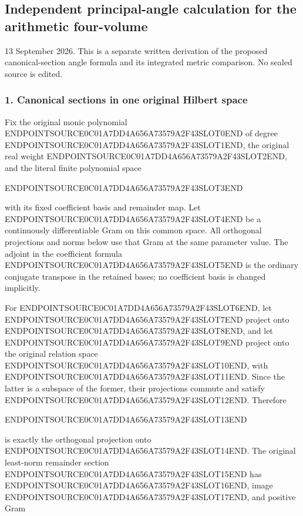 \subsection{Independent principal-angle calculation for the arithmetic four-volume}\label{endpoint-principal_angle_volume_review--independent-principal-angle-calculation-for-the-arithmetic-four-volume}

13 September 2026. This is a separate written derivation of the proposed canonical-section angle formula and its integrated metric comparison. No sealed source is edited.

\subsubsection{1. Canonical sections in one original Hilbert space}\label{endpoint-principal_angle_volume_review--canonical-sections-in-one-original-hilbert-space}

Fix the original monic polynomial ENDPOINTSOURCE0C01A7DD4A656A73579A2F43SLOT0END of degree ENDPOINTSOURCE0C01A7DD4A656A73579A2F43SLOT1END, the original real weight ENDPOINTSOURCE0C01A7DD4A656A73579A2F43SLOT2END, and the literal finite polynomial space

ENDPOINTSOURCE0C01A7DD4A656A73579A2F43SLOT3END

with its fixed coefficient basis and remainder map. Let ENDPOINTSOURCE0C01A7DD4A656A73579A2F43SLOT4END be a continuously differentiable Gram on this common space. All orthogonal projections and norms below use that Gram at the same parameter value. The adjoint in the coefficient formula ENDPOINTSOURCE0C01A7DD4A656A73579A2F43SLOT5END is the ordinary conjugate transpose in the retained bases; no coefficient basis is changed implicitly.

For ENDPOINTSOURCE0C01A7DD4A656A73579A2F43SLOT6END, let ENDPOINTSOURCE0C01A7DD4A656A73579A2F43SLOT7END project onto ENDPOINTSOURCE0C01A7DD4A656A73579A2F43SLOT8END, and let ENDPOINTSOURCE0C01A7DD4A656A73579A2F43SLOT9END project onto the original relation space ENDPOINTSOURCE0C01A7DD4A656A73579A2F43SLOT10END, with ENDPOINTSOURCE0C01A7DD4A656A73579A2F43SLOT11END. Since the latter is a subspace of the former, their projections commute and satisfy ENDPOINTSOURCE0C01A7DD4A656A73579A2F43SLOT12END. Therefore

ENDPOINTSOURCE0C01A7DD4A656A73579A2F43SLOT13END

is exactly the orthogonal projection onto ENDPOINTSOURCE0C01A7DD4A656A73579A2F43SLOT14END. The original least-norm remainder section ENDPOINTSOURCE0C01A7DD4A656A73579A2F43SLOT15END has ENDPOINTSOURCE0C01A7DD4A656A73579A2F43SLOT16END, image ENDPOINTSOURCE0C01A7DD4A656A73579A2F43SLOT17END, and positive Gram

